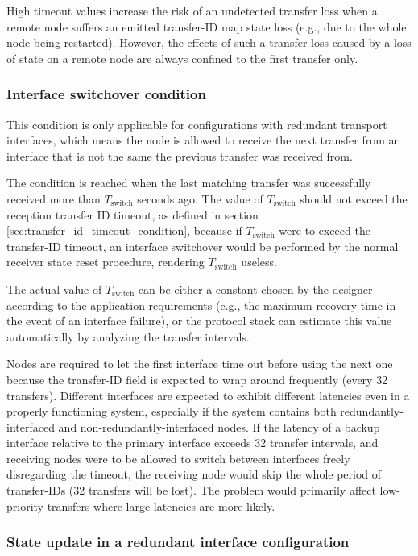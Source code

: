 High timeout values increase the risk of an undetected transfer loss when a remote node suffers an emitted transfer-ID
map state loss (e.g., due to the whole node being restarted).
However, the effects of such a transfer loss caused by a loss of state on a remote node
are always confined to the first transfer only.

\subsubsection{Interface switchover condition}\label{sec:transfer_interface_switchover_condition}

This condition is only applicable for configurations with redundant transport interfaces, which means
the node is allowed to receive the next transfer from an interface that is not the same
the previous transfer was received from.

The condition is reached when the last matching transfer was successfully received more than
$T_\text{switch}$ seconds ago. The value of $T_\text{switch}$ should not exceed the reception transfer
ID timeout, as defined in section \ref{sec:transfer_id_timeout_condition},
because if $T_\text{switch}$ were to exceed the transfer-ID timeout, an interface switchover would be
performed by the normal receiver state reset procedure, rendering $T_\text{switch}$ useless.

The actual value of $T_\text{switch}$ can be either a constant chosen by the designer according
to the application requirements (e.g., the maximum recovery time in the event of an interface failure),
or the protocol stack can estimate this value automatically by analyzing the transfer intervals.

Nodes are required to let the first interface time out before using the next one because the
transfer-ID field is expected to wrap around frequently (every 32 transfers).
Different interfaces are expected to exhibit different latencies even in a properly functioning system,
especially if the system contains both redundantly-interfaced and non-redundantly-interfaced nodes.
If the latency of a backup interface relative to the primary interface exceeds 32 transfer intervals,
and receiving nodes were to be allowed to switch between interfaces freely disregarding the timeout,
the receiving node would skip the whole period of transfer-IDs (32 transfers will be lost).
The problem would primarily affect low-priority transfers where large latencies are more likely.

\subsubsection{State update in a redundant interface configuration}
\label{sec:transfer_reception_state_update_redundant}

